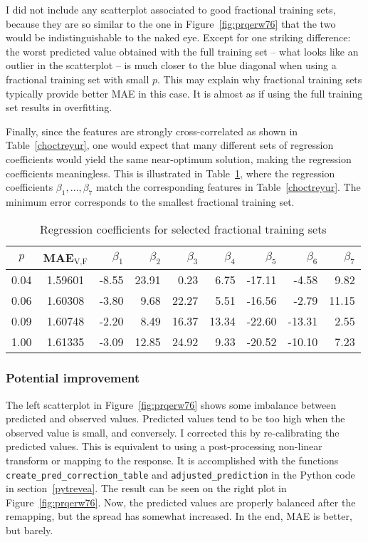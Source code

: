 \documentclass[oneside,10pt]{book}
\begin{document}
I did not include any scatterplot associated to good fractional training sets, because they are so similar to the one in Figure~\ref{fig:prqerw76} that the two would be indistinguishable to the naked eye. Except for one striking difference: the worst
 predicted value obtained with the full training set -- what looks like an outlier in the scatterplot -- is much closer to the blue diagonal when using a fractional training set with small $p$. This may explain why fractional training sets typically provide better MAE in this case. It is almost as if using the full training set results in overfitting.

Finally, since the features are strongly cross-correlated as shown in Table~\ref{choctreyur}, one would expect that
 many different sets of regression coefficients would yield the same near-optimum solution, making the regression
 coefficients meaningless. This is illustrated in Table~\ref{cho98treyur}, where the regression coefficients $\beta_1,\dots,\beta_7$
 match the corresponding features in Table~\ref{choctreyur}. The minimum error corresponds to the smallest fractional training set.

\begin{table}[H]
\begin{center}
\begin{tabular}{c|c|rrrrrrr}
\hline
  $p$ & MAE$_{\text{V,F}}$ & $\beta_1$ &         $\beta_2$ &         $\beta_3$ &         $\beta_4$ &        $\beta_5$ &         $\beta_6$ &     $\beta_7$   \\
\hline
\hline
0.04	& 1.59601 & -8.55	& 23.91 & 0.23 &6.75 &-17.11&	-4.58	&9.82\\
0.06	& 1.60308&	-3.80	&9.68	&22.27	&5.51	&-16.56	&-2.79	&11.15 \\
0.09	&1.60748&	-2.20	&8.49	&16.37	&13.34&	-22.60	&-13.31&	2.55 \\
1.00	&1.61335&	-3.09	&12.85	&24.92&	9.33	&-20.52&	-10.10	&7.23 \\
\hline
\end{tabular}
\caption{\label{cho98treyur} Regression coefficients for selected fractional training sets}
\end{center}
\end{table}

\subsubsection{Potential improvement}\label{impores}

The left scatterplot in Figure~\ref{fig:prqerw76} shows some imbalance between predicted and observed values. Predicted values tend to be too high when the observed value is small, and conversely. I corrected this by re-calibrating the predicted values. This is equivalent to using a
 post-processing non-linear transform or mapping to the response. It is accomplished with the functions
\texttt{create\_pred\_correction\_table} and \texttt{adjusted\_prediction} in the Python code in section~\ref{pytrevea}. The result can be seen on the right plot in Figure~\ref{fig:prqerw76}. Now, the predicted values are properly balanced after the remapping, but the spread has somewhat increased. In the end, MAE is
 better, but barely.
\end{document}
